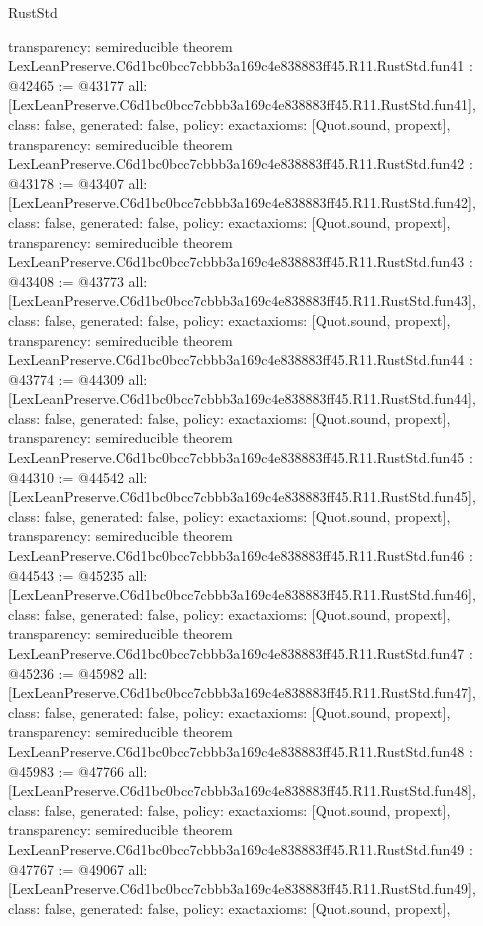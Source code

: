 \begin{lexlean}{RustStd}
\begin{coremodule}
{  transparency: semireducible
}
theorem LexLeanPreserve.C6d1bc0bcc7cbbb3a169c4e838883ff45.R11.RustStd.fun41 : @42465 := @43177 {
  all: [LexLeanPreserve.C6d1bc0bcc7cbbb3a169c4e838883ff45.R11.RustStd.fun41],
  class: false,
  generated: false,
  policy: exact{axioms: [Quot.sound, propext]},
  transparency: semireducible
}
theorem LexLeanPreserve.C6d1bc0bcc7cbbb3a169c4e838883ff45.R11.RustStd.fun42 : @43178 := @43407 {
  all: [LexLeanPreserve.C6d1bc0bcc7cbbb3a169c4e838883ff45.R11.RustStd.fun42],
  class: false,
  generated: false,
  policy: exact{axioms: [Quot.sound, propext]},
  transparency: semireducible
}
theorem LexLeanPreserve.C6d1bc0bcc7cbbb3a169c4e838883ff45.R11.RustStd.fun43 : @43408 := @43773 {
  all: [LexLeanPreserve.C6d1bc0bcc7cbbb3a169c4e838883ff45.R11.RustStd.fun43],
  class: false,
  generated: false,
  policy: exact{axioms: [Quot.sound, propext]},
  transparency: semireducible
}
theorem LexLeanPreserve.C6d1bc0bcc7cbbb3a169c4e838883ff45.R11.RustStd.fun44 : @43774 := @44309 {
  all: [LexLeanPreserve.C6d1bc0bcc7cbbb3a169c4e838883ff45.R11.RustStd.fun44],
  class: false,
  generated: false,
  policy: exact{axioms: [Quot.sound, propext]},
  transparency: semireducible
}
theorem LexLeanPreserve.C6d1bc0bcc7cbbb3a169c4e838883ff45.R11.RustStd.fun45 : @44310 := @44542 {
  all: [LexLeanPreserve.C6d1bc0bcc7cbbb3a169c4e838883ff45.R11.RustStd.fun45],
  class: false,
  generated: false,
  policy: exact{axioms: [Quot.sound, propext]},
  transparency: semireducible
}
theorem LexLeanPreserve.C6d1bc0bcc7cbbb3a169c4e838883ff45.R11.RustStd.fun46 : @44543 := @45235 {
  all: [LexLeanPreserve.C6d1bc0bcc7cbbb3a169c4e838883ff45.R11.RustStd.fun46],
  class: false,
  generated: false,
  policy: exact{axioms: [Quot.sound, propext]},
  transparency: semireducible
}
theorem LexLeanPreserve.C6d1bc0bcc7cbbb3a169c4e838883ff45.R11.RustStd.fun47 : @45236 := @45982 {
  all: [LexLeanPreserve.C6d1bc0bcc7cbbb3a169c4e838883ff45.R11.RustStd.fun47],
  class: false,
  generated: false,
  policy: exact{axioms: [Quot.sound, propext]},
  transparency: semireducible
}
theorem LexLeanPreserve.C6d1bc0bcc7cbbb3a169c4e838883ff45.R11.RustStd.fun48 : @45983 := @47766 {
  all: [LexLeanPreserve.C6d1bc0bcc7cbbb3a169c4e838883ff45.R11.RustStd.fun48],
  class: false,
  generated: false,
  policy: exact{axioms: [Quot.sound, propext]},
  transparency: semireducible
}
theorem LexLeanPreserve.C6d1bc0bcc7cbbb3a169c4e838883ff45.R11.RustStd.fun49 : @47767 := @49067 {
  all: [LexLeanPreserve.C6d1bc0bcc7cbbb3a169c4e838883ff45.R11.RustStd.fun49],
  class: false,
  generated: false,
  policy: exact{axioms: [Quot.sound, propext]},
}
\end{coremodule}
\end{lexlean}
